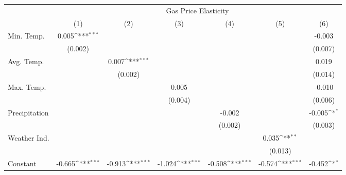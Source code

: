 {
\def\sym#1{\ifmmode^{#1}\else\(^{#1}\)\fi}
\begin{tabular}{l*{6}{c}}
\hline\hline
            &\multicolumn{6}{c}{Gas Price Elasticity}                                                                                           \\
            &\multicolumn{1}{c}{(1)}         &\multicolumn{1}{c}{(2)}         &\multicolumn{1}{c}{(3)}         &\multicolumn{1}{c}{(4)}         &\multicolumn{1}{c}{(5)}         &\multicolumn{1}{c}{(6)}         \\
\hline
Min. Temp.  &       0.005\sym{***}&                     &                     &                     &                     &      -0.003         \\
            &     (0.002)         &                     &                     &                     &                     &     (0.007)         \\
[1em]
Avg. Temp.  &                     &       0.007\sym{***}&                     &                     &                     &       0.019         \\
            &                     &     (0.002)         &                     &                     &                     &     (0.014)         \\
[1em]
Max. Temp.  &                     &                     &       0.005         &                     &                     &      -0.010         \\
            &                     &                     &     (0.004)         &                     &                     &     (0.006)         \\
[1em]
Precipitation&                     &                     &                     &      -0.002         &                     &      -0.005\sym{*}  \\
            &                     &                     &                     &     (0.002)         &                     &     (0.003)         \\
[1em]
Weather Ind.&                     &                     &                     &                     &       0.035\sym{**} &                     \\
            &                     &                     &                     &                     &     (0.013)         &                     \\
[1em]
Constant    &      -0.665\sym{***}&      -0.913\sym{***}&      -1.024\sym{***}&      -0.508\sym{***}&      -0.574\sym{***}&      -0.452\sym{*}  \\

\end{tabular}}
